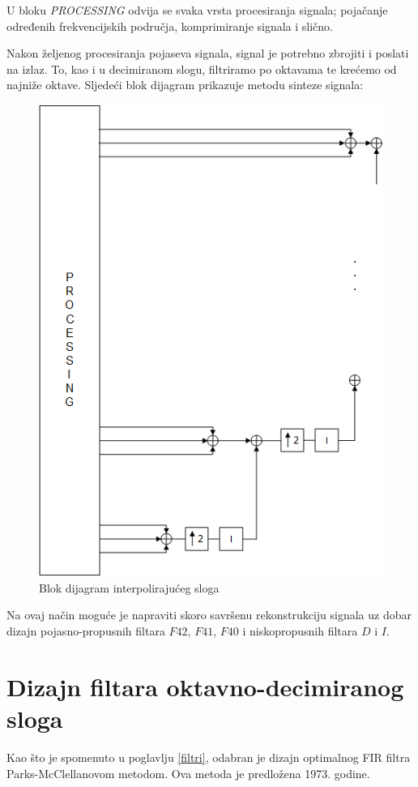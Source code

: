 \documentclass[times, utf8, diplomski]{fer}
\begin{document}
U bloku \textit{PROCESSING} odvija se svaka vrsta procesiranja signala; pojačanje određenih frekvencijskih područja, komprimiranje signala i slično.

Nakon željenog procesiranja pojaseva signala, signal je potrebno zbrojiti i poslati na izlaz. To, kao i u decimiranom slogu, filtriramo po oktavama te krećemo od najniže oktave. Sljedeći blok dijagram prikazuje metodu sinteze signala:


\begin{figure}[hbt!]
 \centering
 \includegraphics[scale=0.6]{photos/intslog.png}
 \caption{Blok dijagram interpolirajućeg sloga}
 \label{intslog}
\end{figure}

Na ovaj način moguće je napraviti skoro savršenu rekonstrukciju signala uz dobar dizajn pojasno-propusnih filtara $F42$, $F41$, $F40$ i niskopropusnih filtara $D$ i $I$.


\section{Dizajn filtara oktavno-decimiranog sloga}
Kao što je spomenuto u poglavlju \ref{filtri}, odabran je dizajn optimalnog FIR filtra Parks-McClellanovom metodom. Ova metoda je predložena 1973. godine.
\end{document}
